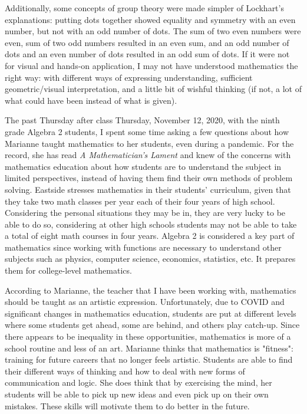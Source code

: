 \documentclass{article}
\begin{document}
Additionally, some concepts of group theory were made simpler of Lockhart's explanations: putting dots together showed equality and symmetry with an even number, but not with an odd number of dots. The sum of two even numbers were even, sum of two odd numbers resulted in an even sum, and an odd number of dots and an even number of dots resulted in an odd sum of dots. If it were not for visual and hands-on application, I may not have understood mathematics the right way: with different ways of expressing understanding, sufficient geometric/visual interpretation, and a little bit of wishful thinking (if not, a lot of what could have been instead of what is given). 

The past Thursday after class Thursday, November 12, 2020, with the ninth grade Algebra 2 students, I spent some time asking a few questions about how Marianne taught mathematics to her students, even during a pandemic. For the record, she has read \textit{A Mathematician's Lament} and knew of the concerns with mathematics education about how students are to understand the subject in limited perspectives, instead of having them find their own methods of problem solving. Eastside stresses mathematics in their students' curriculum, given that they take two math classes per year each of their four years of high school. Considering the personal situations they may be in, they are very lucky to be able to do so, considering at other high schools students may not be able to take a total of eight math courses in four years. Algebra 2 is considered a key part of mathematics since working with functions are necessary to understand other subjects such as physics, computer science, economics, statistics, etc. It prepares them for college-level mathematics. 

According to Marianne, the teacher that I have been working with, mathematics should be taught as an artistic expression. Unfortunately, due to COVID and significant changes in mathematics education, students are put at different levels where some students get ahead, some are behind, and others play catch-up. Since there appears to be inequality in these opportunities, mathematics is more of a school routine and less of an art. Marianne thinks that mathematics is "fitness": training for future careers that no longer feels artistic. Students are able to find their different ways of thinking and how to deal with new forms of communication and logic. She does think that by exercising the mind, her students will be able to pick up new ideas and even pick up on their own mistakes. These skills will motivate them to do better in the future. 
\end{document}
